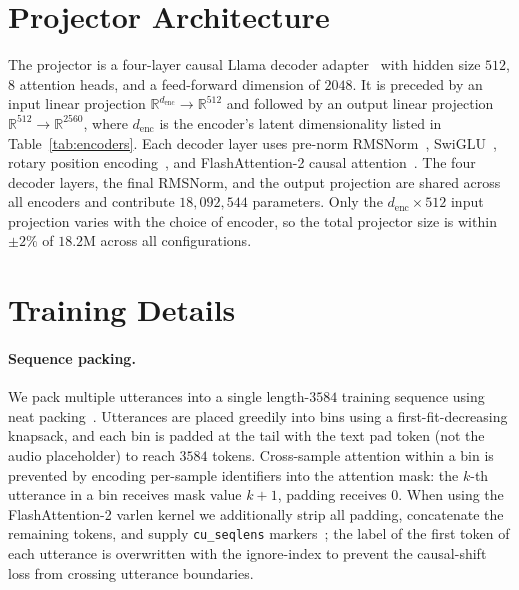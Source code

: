 %

\appendix

\section{Projector Architecture}
\label{app:projector}

The projector is a four-layer causal Llama decoder adapter~\cite{Ll23} with hidden size $512$, $8$ attention heads, and a feed-forward dimension of $2048$.
It is preceded by an input linear projection $\mathbb{R}^{d_{\text{enc}}} \!\to\! \mathbb{R}^{512}$ and followed by an output linear projection $\mathbb{R}^{512} \!\to\! \mathbb{R}^{2560}$, where $d_{\text{enc}}$ is the encoder's latent dimensionality listed in Table~\ref{tab:encoders}.
Each decoder layer uses pre-norm RMSNorm~\cite{ZL20}, SwiGLU~\cite{Sh20}, rotary position encoding~\cite{SP23}, and FlashAttention-2 causal attention~\cite{Dao23}.
The four decoder layers, the final RMSNorm, and the output projection are shared across all encoders and contribute $18{,}092{,}544$ parameters.
Only the $d_{\text{enc}} \!\times\! 512$ input projection varies with the choice of encoder, so the total projector size is within $\pm 2\%$ of $18.2$M across all configurations.

\section{Training Details}
\label{app:training}

\paragraph{Sequence packing.}
We pack multiple utterances into a single length-$3584$ training sequence using neat packing~\cite{Kundu24,Kr23}.
Utterances are placed greedily into bins using a first-fit-decreasing knapsack, and each bin is padded at the tail with the text pad token (not the audio placeholder) to reach $3584$ tokens.
Cross-sample attention within a bin is prevented by encoding per-sample identifiers into the attention mask: the $k$-th utterance in a bin receives mask value $k+1$, padding receives $0$.
When using the FlashAttention-2 varlen kernel we additionally strip all padding, concatenate the remaining tokens, and supply \texttt{cu\_seqlens} markers~\cite{Dao23}; the label of the first token of each utterance is overwritten with the ignore-index to prevent the causal-shift loss from crossing utterance boundaries.

